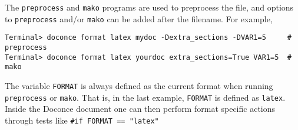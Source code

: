 \documentclass[%
oneside,                 %
final,                   %
10pt]{article}
\begin{document}
The {\fontsize{10pt}{10pt}\Verb!preprocess!} and {\fontsize{10pt}{10pt}\Verb!mako!} programs are used to preprocess the
file, and options to {\fontsize{10pt}{10pt}\Verb!preprocess!} and/or {\fontsize{10pt}{10pt}\Verb!mako!} can be added after the
filename. For example,
\vspace{4pt}
\begin{Verbatim}[numbers=none,frame=lines,fontsize=\fontsize{9pt}{9pt},labelposition=topline,framesep=2.5mm,framerule=0.7pt]
Terminal> doconce format latex mydoc -Dextra_sections -DVAR1=5     # preprocess
Terminal> doconce format latex yourdoc extra_sections=True VAR1=5  # mako
\end{Verbatim}
The variable {\fontsize{10pt}{10pt}\Verb!FORMAT!} is always defined as the current format when
running {\fontsize{10pt}{10pt}\Verb!preprocess!} or {\fontsize{10pt}{10pt}\Verb!mako!}. That is, in the last example, {\fontsize{10pt}{10pt}\Verb!FORMAT!} is
defined as {\fontsize{10pt}{10pt}\Verb!latex!}. Inside the Doconce document one can then perform
format specific actions through tests like {\fontsize{10pt}{10pt}\Verb!#if FORMAT == "latex"!}
\end{document}
